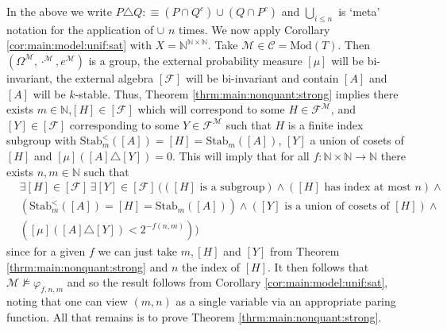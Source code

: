 \documentclass[11pt]{amsart}
\theoremstyle{definition}
\theoremstyle{remark}
\def\NN{\mathbb{N}}
\begin{document}
In the above we write $P\triangle Q:\equiv (P\cap Q^c) \cup (Q\cap P^c)$ and $\bigcup_{i\le n}$ is `meta' notation for the application of $\cup$ $n$ times. We now apply Corollary \ref{cor:main:model:unif:sat} with $X= \NN^{\NN \times \NN}$. Take $\mathcal{M} \in \mathscr{C}=\mathrm{Mod}(T)$. Then $(\Omega^{\mathcal{M}},\cdot^{\mathcal{M}},e^\mathcal{M})$ is a group, the external probability measure $[\mu]$ will be bi-invariant, the external algebra $[\mathcal{F}]$ will be bi-invariant and contain $[A]$ and $[A]$ will be $k$-stable. Thus, Theorem \ref{thrm:main:nonquant:strong} implies there exists $m \in \NN$,$[H]\in [\mathcal{F}]$ which will correspond to some $H \in \mathcal{F}^{\mathcal{M}}$, and  $[Y] \in [\mathcal{F}]$ corresponding to some $Y \in \mathcal{F}^{\mathcal{M}}$ such that $H$ is a finite index subgroup with $\mathrm{Stab}^<_m([A])=[H]=\mathrm{Stab}_m([A])$, $[Y]$ a union of cosets of $[H]$ and $[\mu]([A]\triangle[Y]) =0$. This will imply that for all $f:\NN \times \NN \to \NN$ there exists $n,m \in \NN$ such that
\begin{equation*}
    \begin{aligned}
            &\exists [H] \in [\mathcal{F}]\,\exists [Y]\in [\mathcal{F}]\,((\mbox{$[H]$ is a subgroup})\land(\mbox{$[H]$ has index at most $n$})\land\\
            &(\mathrm{Stab}^<_m([A])=[H]=\mathrm{Stab}_m([A]))\land (\mbox{$[Y]$ is a union of cosets of $[H]$})\land\\
            &([\mu]([A] \triangle [Y])< 2^{-f(n,m)}))
    \end{aligned}
\end{equation*}
since for a given $f$ we can just take  $m, [H]$ and $[Y]$ from Theorem \ref{thrm:main:nonquant:strong} and $n$ the index of $[H]$. It then follows that $\mathcal{M}\nvDash \varphi_{f,n,m}$ and so the result follows from Corollary \ref{cor:main:model:unif:sat}, noting that one can view $(m,n)$ as a single variable via an appropriate paring function. All that remains is to prove Theorem \ref{thrm:main:nonquant:strong}. 
\end{document}
